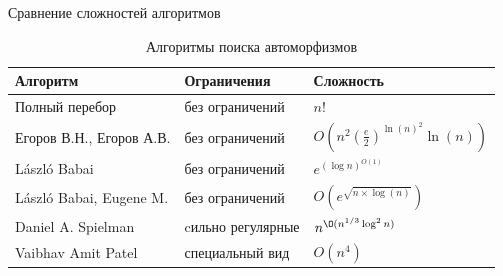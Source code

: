 \documentclass{beamer}
\begin{document}
\begin{frame}{Сравнение сложностей алгоритмов}

\begin{table}[h]
\centering
\small
\begin{tabular}[t]{|l|l|l|}
\hline
\textbf{Алгоритм} & \textbf{Ограничения} & \textbf{Сложность}\\
\hline
Полный перебор & без ограничений & $n!$\\
\hline
Егоров В.Н., Егоров А.В. & без ограничений & $O(n^2(\frac{e}{2})^{\ln(n)^2} \ln(n))$\\
\hline
László Babai & без ограничений & $e^{(\log{n})^{O(1)}}$\\
\hline
László Babai, Eugene M. & без ограничений & $O(e^{\sqrt{n \times \log(n)}})$\\
\hline
Daniel A. Spielman & cильно регулярные & $n^{\O({n^{1/3}\log^{2} n})}$\\
\hline
Vaibhav Amit Patel & специальный вид & $O(n^4)$\\
\hline
\end{tabular}
\caption{Алгоритмы поиска автоморфизмов}
\end{table}


\end{frame}
\end{document}
